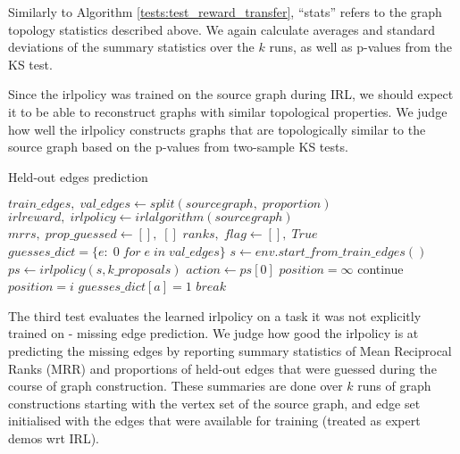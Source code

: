 \documentclass{report}
\numberwithin{equation}{section}
\numberwithin{figure}{section}
\numberwithin{table}{section}
\numberwithin{algorithm}{section}
\begin{document}
Similarly to Algorithm \ref{tests:test_reward_transfer}, ``stats'' 
refers to the graph topology statistics described above. We again 
calculate averages and standard deviations of the summary statistics 
over the $k$ runs, as well as p-values from the KS test.

Since the irlpolicy was trained on the source graph during IRL, 
we should expect it to be able to reconstruct graphs with similar 
topological properties. We judge how well the irlpolicy constructs 
graphs that are topologically similar to the source graph 
based on the p-values 
from two-sample KS tests.

\begin{algorithm}
  \caption{Held-out edges prediction}
  \label{tests:test_edge_prediction}
  \begin{algorithmic}
    \State $train\_edges,\; val\_edges \gets split(sourcegraph,\; proportion)$
    \State $irlreward,\; irlpolicy \gets irlalgorithm(sourcegraph)$
    \State $mrrs,\; prop\_guessed \gets [],\;[]$
      \State $ranks,\; flag \gets [],\; True$
      \State $guesses\_dict=\{e:\; 0\; for\; e\; in\; val\_edges\}$
      \State $s \gets env.start\_from\_train\_edges()$
        \State $ps \gets irlpolicy(s, k\_proposals)$
        \State $action\gets ps[0]$
        \State $position=\infty$
            \State continue
          \EndIf
          \EndIf
            \State $position=i$
            \State $guesses\_dict[a] = 1$
            \State $break$
          \EndIf
        \EndFor
      \EndWhile
    \EndFor
  \end{algorithmic}
\end{algorithm}

The third test evaluates the learned irlpolicy on a task it was not 
explicitly trained on - missing edge prediction. We judge how good 
the irlpolicy is at predicting the missing edges by reporting summary 
statistics of Mean Reciprocal Ranks (MRR) and proportions of held-out 
edges that were guessed during the course of graph construction.
These summaries are done over $k$ runs 
of graph constructions starting with the vertex set of the source 
graph, and edge set initialised with the edges that were 
available for training (treated as expert demos wrt IRL). 
\end{document}
